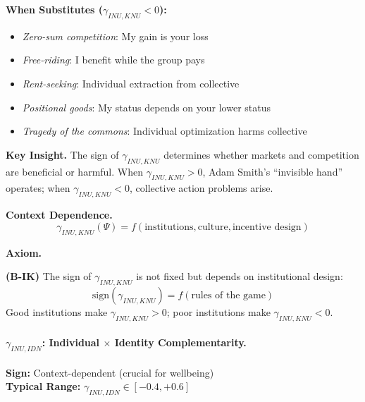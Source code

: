 \textbf{When Substitutes ($\gamma_{INU,KNU} < 0$):}
\begin{itemize}
    \item \textit{Zero-sum competition}: My gain is your loss
    \item \textit{Free-riding}: I benefit while the group pays
    \item \textit{Rent-seeking}: Individual extraction from collective
    \item \textit{Positional goods}: My status depends on your lower status
    \item \textit{Tragedy of the commons}: Individual optimization harms collective
\end{itemize}

\textbf{Key Insight.}
The sign of $\gamma_{INU,KNU}$ determines whether markets and competition 
are beneficial or harmful. When $\gamma_{INU,KNU} > 0$, Adam Smith's 
``invisible hand'' operates; when $\gamma_{INU,KNU} < 0$, collective action 
problems arise.

\textbf{Context Dependence.}
\begin{equation}
\gamma_{INU,KNU}(\Psi) = f(\text{institutions}, \text{culture}, \text{incentive design})
\end{equation}

\textbf{Axiom.}
\begin{axiom}
\label{ax:B-IK}
\textbf{(B-IK)} The sign of $\gamma_{INU,KNU}$ is not fixed but depends on 
institutional design:
\begin{equation}
    \text{sign}(\gamma_{INU,KNU}) = f(\text{rules of the game})
\end{equation}
Good institutions make $\gamma_{INU,KNU} > 0$; poor institutions make 
$\gamma_{INU,KNU} < 0$.
\end{axiom}


\paragraph{$\gamma_{INU,IDN}$: Individual $\times$ Identity Complementarity.}

\begin{tcolorbox}[colback=yellow!5, colframe=yellow!50!black]
\textbf{Sign:} Context-dependent (crucial for wellbeing) \\
\textbf{Typical Range:} $\gamma_{INU,IDN} \in [-0.4, +0.6]$
\end{tcolorbox}

